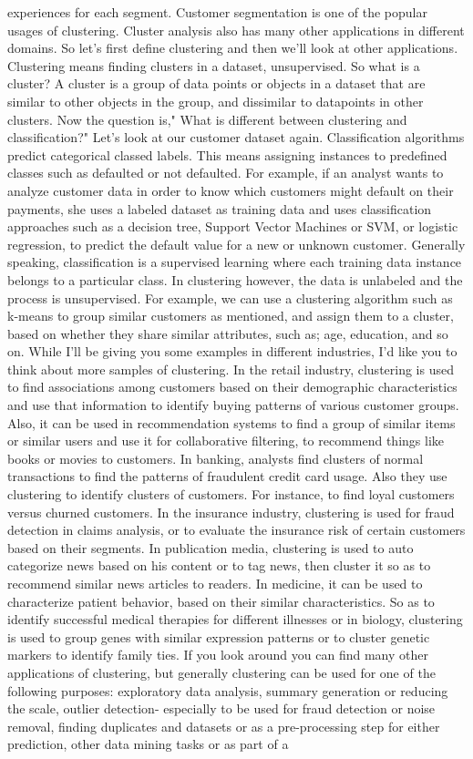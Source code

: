 experiences for each segment. Customer segmentation is one of the popular usages of clustering. Cluster analysis also has many other applications in different domains. So let's first define clustering and then we'll look at other applications. Clustering means finding clusters in a dataset, unsupervised. So what is a cluster? A cluster is a group of data points or objects in a dataset that are similar to other objects in the group, and dissimilar to datapoints in other clusters. Now the question is," What is different between clustering and classification?" Let's look at our customer dataset again. Classification algorithms predict categorical classed labels. This means assigning instances to predefined classes such as defaulted or not defaulted. For example, if an analyst wants to analyze customer data in order to know which customers might default on their payments, she uses a labeled dataset as training data and uses classification approaches such as a decision tree, Support Vector Machines or SVM, or logistic regression, to predict the default value for a new or unknown customer. Generally speaking, classification is a supervised learning where each training data instance belongs to a particular class. In clustering however, the data is unlabeled and the process is unsupervised. For example, we can use a clustering algorithm such as k-means to group similar customers as mentioned, and assign them to a cluster, based on whether they share similar attributes, such as; age, education, and so on. While I'll be giving you some examples in different industries, I'd like you to think about more samples of clustering. In the retail industry, clustering is used to find associations among customers based on their demographic characteristics and use that information to identify buying patterns of various customer groups. Also, it can be used in recommendation systems to find a group of similar items or similar users and use it for collaborative filtering, to recommend things like books or movies to customers. In banking, analysts find clusters of normal transactions to find the patterns of fraudulent credit card usage. Also they use clustering to identify clusters of customers. For instance, to find loyal customers versus churned customers. In the insurance industry, clustering is used for fraud detection in claims analysis, or to evaluate the insurance risk of certain customers based on their segments. In publication media, clustering is used to auto categorize news based on his content or to tag news, then cluster it so as to recommend similar news articles to readers. In medicine, it can be used to characterize patient behavior, based on their similar characteristics. So as to identify successful medical therapies for different illnesses or in biology, clustering is used to group genes with similar expression patterns or to cluster genetic markers to identify family ties. If you look around you can find many other applications of clustering, but generally clustering can be used for one of the following purposes: exploratory data analysis, summary generation or reducing the scale, outlier detection- especially to be used for fraud detection or noise removal, finding duplicates and datasets or as a pre-processing step for either prediction, other data mining tasks or as part of a 